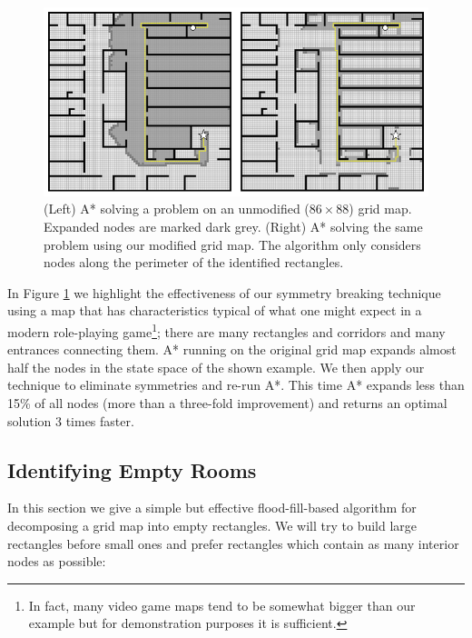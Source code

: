 \begin{figure}[t]
\centering
\includegraphics[width=0.95\columnwidth, trim = 10mm 10mm 10mm 0mm]{chapter_rsr/diagrams/rsr_example.png}
\caption[Searching with A{*} vs. A{*} + RSR] 
{\small
(Left) A* solving a problem on an unmodified ($86\times88$) grid map. 
Expanded nodes are marked dark grey.
(Right) A* solving the same problem using our modified grid map. 
The algorithm only considers nodes along the perimeter of the identified rectangles.}
\label{fig::rsr::contrast}
\end{figure}

In Figure \ref{fig::rsr::contrast} we highlight the effectiveness of our symmetry breaking technique using
a map that has characteristics typical of what one might expect in a modern role-playing game\footnote{
In fact, many video game maps tend to be somewhat bigger than our example but for demonstration 
purposes it is sufficient.};
there are many rectangles and corridors and many entrances connecting them.
A* running on the original grid map expands almost half the nodes
in the state space of the shown example.
We then apply our technique to eliminate symmetries and re-run A*.
This time A* expands less than 15\% of all nodes (more than a three-fold
improvement) and returns an optimal solution 3 times faster.

\subsection{Identifying Empty Rooms}
\label{cha::rsr::rectangles}
In this section we give a simple but effective flood-fill-based algorithm for decomposing a 
grid map into empty rectangles.
We will try to build large rectangles before small ones and prefer rectangles which
contain as many interior nodes as possible:

